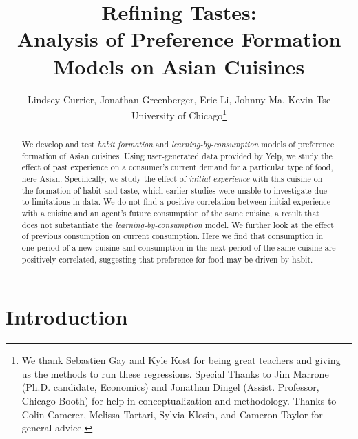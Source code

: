 \documentclass[Journal,letterpaper, NoLineNumbers]{ascelike-new}
\begin{document}
\title{ Refining Tastes:\\
Analysis of Preference Formation Models on Asian Cuisines}

\author[1]{Lindsey Currier, Jonathan Greenberger, Eric Li, Johnny Ma, Kevin Tse \\ University of Chicago\footnote{We thank Sebastien Gay and Kyle Kost for being great teachers and giving us the methods to run these regressions. Special Thanks to Jim Marrone (Ph.D. candidate, Economics) and Jonathan Dingel (Assist. Professor, Chicago Booth) for help in conceptualization and methodology. Thanks to Colin Camerer, Melissa Tartari, Sylvia Klosin, and Cameron Taylor for general advice.}}
\maketitle



\begin{abstract}
We develop and test \textit{habit formation} and \textit{learning-by-consumption} models of preference formation of Asian cuisines. Using user-generated data provided by Yelp, we study the effect of past experience on a consumer's current demand for a particular type of food, here Asian. Specifically, we study the effect of \textit{initial experience} with this cuisine on the formation of habit and taste, which earlier studies were unable to investigate due to limitations in data.  We do not find a positive correlation between initial experience with a cuisine and an agent's future consumption of the same cuisine, a result that does not substantiate the \textit{learning-by-consumption} model. We further look at the effect of previous consumption on current consumption. Here we find that consumption in one period of a new cuisine and consumption in the next period of the same cuisine are positively correlated, suggesting that preference for food may be driven by habit.
\end{abstract}

\section{Introduction}
 
\end{document}
